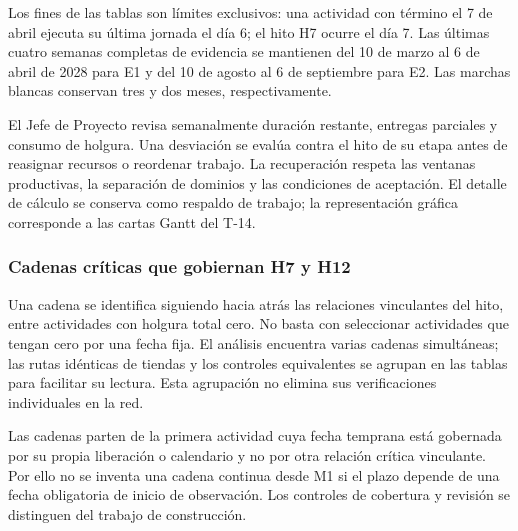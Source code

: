 \documentclass[11pt]{article}
\begin{document}
Los fines de las tablas son límites exclusivos: una actividad con término el 7 de abril ejecuta su última jornada el día 6; el hito H7 ocurre el día 7. Las últimas cuatro semanas completas de evidencia se mantienen del 10 de marzo al 6 de abril de 2028 para E1 y del 10 de agosto al 6 de septiembre para E2. Las marchas blancas conservan tres y dos meses, respectivamente.

El Jefe de Proyecto revisa semanalmente duración restante, entregas parciales y consumo de holgura. Una desviación se evalúa contra el hito de su etapa antes de reasignar recursos o reordenar trabajo. La recuperación respeta las ventanas productivas, la separación de dominios y las condiciones de aceptación. El detalle de cálculo se conserva como respaldo de trabajo; la representación gráfica corresponde a las cartas Gantt del T-14.

\subsubsection{Cadenas críticas que gobiernan H7 y H12}

Una cadena se identifica siguiendo hacia atrás las relaciones vinculantes del hito, entre actividades con holgura total cero. No basta con seleccionar actividades que tengan cero por una fecha fija. El análisis encuentra varias cadenas simultáneas; las rutas idénticas de tiendas y los controles equivalentes se agrupan en las tablas para facilitar su lectura. Esta agrupación no elimina sus verificaciones individuales en la red.

Las cadenas parten de la primera actividad cuya fecha temprana está gobernada por su propia liberación o calendario y no por otra relación crítica vinculante. Por ello no se inventa una cadena continua desde M1 si el plazo depende de una fecha obligatoria de inicio de observación. Los controles de cobertura y revisión se distinguen del trabajo de construcción.
\end{document}
